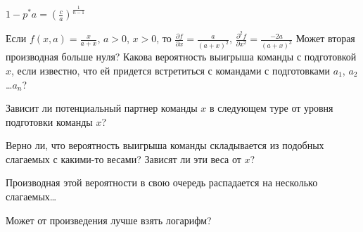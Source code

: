 \begin{solution}{4.39}

\end{solution}
\begin{solution}{4.40}

\end{solution}
\begin{solution}{4.41}

\end{solution}
\begin{solution}{4.42}

$1-p^{*}a=\left(\frac{c}{a}\right)^{\frac{1}{n-1}}$
\end{solution}
\begin{solution}{4.43}

\end{solution}
\begin{solution}{4.44}

\end{solution}
\begin{solution}{4.45}

\end{solution}
\begin{solution}{4.46}
Если  $f\left(x,a\right)=\frac{x}{a+x} $,  $a>0$,  $x>0$, то  $\frac{\partial f}{\partial x} =\frac{a}{\left(a+x\right)^{2} } $,  $\frac{\partial ^{2} f}{\partial x^{2} } =\frac{-2a}{\left(a+x\right)^{3} } $
Может вторая производная больше нуля?
Какова вероятность выигрыша команды с подготовкой  $x$, если известно, что ей придется встретиться с командами с подготовками  $a_{1} $,  $a_{2} $ \ldots  $a_{n} $? \par
Зависит ли потенциальный партнер команды  $x$  в следующем туре от уровня подготовки команды  $x$?\par
Верно ли, что вероятность выигрыша команды складывается из подобных слагаемых с какими-то весами? Зависят ли эти веса от  $x$?\par
Производная этой вероятности в свою очередь распадается на несколько слагаемых\ldots \par
Может от произведения лучше взять логарифм?
\end{solution}
\begin{solution}{4.47}

\end{solution}
\begin{solution}{4.48}

\end{solution}
